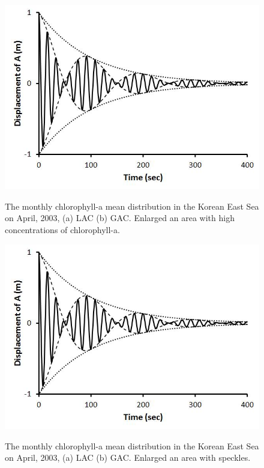   \begin{figure}[b]
  	\centering
  	\includegraphics[width=1.0\linewidth]{../images/monHISHI}\\
  	\caption{The monthly chlorophyll-a mean distribution in the Korean East Sea on April, 2003, (a) LAC (b) GAC. Enlarged an area with high concentrations of chlorophyll-a.}
  	\label{fig:monHISHI}
  \end{figure}
  
    \begin{figure}[t]
  	\centering
  	\includegraphics[width=0.8\linewidth]{../images/monHISSPEC}\\
  	\caption{The monthly chlorophyll-a mean distribution in the Korean East Sea on April, 2003, (a) LAC (b) GAC. Enlarged an area with speckles.}
  	\label{fig:monHISSPEC}
  \end{figure}
  